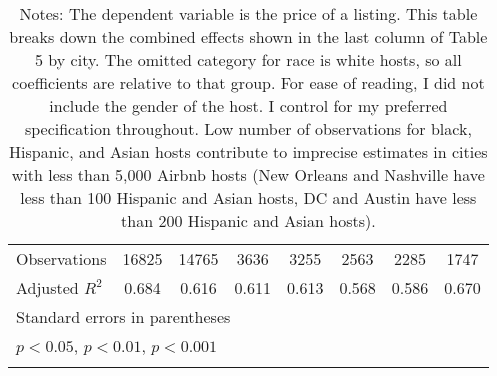 {\begin{longtable}{l*{7}{c}}
\hline
Observations        &       16825         &       14765         &        3636         &        3255         &        2563         &        2285         &        1747         \\
Adjusted \(R^{2}\)  &       0.684         &       0.616         &       0.611         &       0.613         &       0.568         &       0.586         &       0.670         \\
\hline\hline
\multicolumn{8}{l}{\footnotesize Standard errors in parentheses}\\
\multicolumn{8}{l}{\footnotesize \sym{*} \(p<0.05\), \sym{**} \(p<0.01\), \sym{***} \(p<0.001\)}\\
\caption*{Notes: The dependent variable is the price of a listing. This table breaks down the combined effects shown in the last column of Table 5 by city. The omitted category for race is white hosts, so all coefficients are relative to that group. For ease of reading, I did not include the gender of the host. I control for my preferred specification throughout. Low number of observations for black, Hispanic, and Asian hosts contribute to imprecise estimates in cities with less than 5,000 Airbnb hosts (New Orleans and Nashville have less than 100 Hispanic and Asian hosts, DC and Austin have less than 200 Hispanic and Asian hosts).}
\end{longtable}
}


